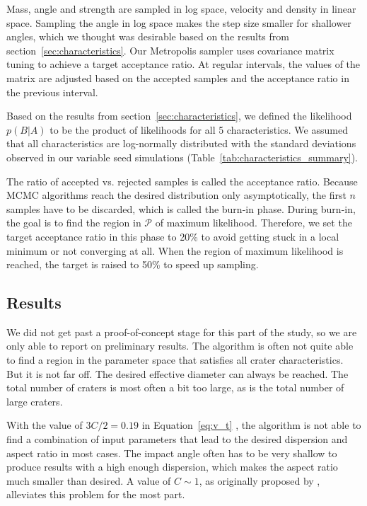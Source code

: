 Mass, angle and strength are sampled in log space, velocity and density in linear space. Sampling the angle in log space makes the step size smaller for shallower angles, which we thought was desirable based on the results from section~\ref{sec:characteristics}.
Our Metropolis sampler uses covariance matrix tuning to achieve a target acceptance ratio. At regular intervals, the values of the matrix are adjusted based on the accepted samples and the acceptance ratio in the previous interval.

Based on the results from section~\ref{sec:characteristics}, we defined the likelihood $p(B|A)$ to be the product of likelihoods for all 5 characteristics. We assumed that all characteristics are log-normally distributed with the standard deviations observed in our variable seed simulations (Table~\ref{tab:characteristics_summary}).

The ratio of accepted vs. rejected samples is called the acceptance ratio.
Because MCMC algorithms reach the desired distribution only asymptotically, the first $n$ samples have to be discarded, which is called the burn-in phase.
During burn-in, the goal is to find the region in $\mathcal{P}$ of maximum likelihood.
Therefore, we set the target acceptance ratio in this phase to 20\% to avoid getting stuck in a local minimum or not converging at all.
When the region of maximum likelihood is reached, the target is raised to 50\% to speed up sampling.

\subsection{Results}

We did not get past a proof-of-concept stage for this part of the study, so we are only able to report on preliminary results.
The algorithm is often not quite able to find a region in the parameter space that satisfies all crater characteristics. But it is not far off.
The desired effective diameter can always be reached. The total number of craters is most often a bit too large, as is the total number of large craters.

With the value of $3C/2 = 0.19$ in Equation~\ref{eq:v_t} \citep{artemieva2001motion}, the algorithm is not able to find a combination of input parameters that lead to the desired dispersion and aspect ratio in most cases. The impact angle often has to be very shallow to produce results with a high enough dispersion, which makes the aspect ratio much smaller than desired. A value of 
$C\sim 1$, as originally proposed by \cite{passey1980effects}, alleviates this problem for the most part.

